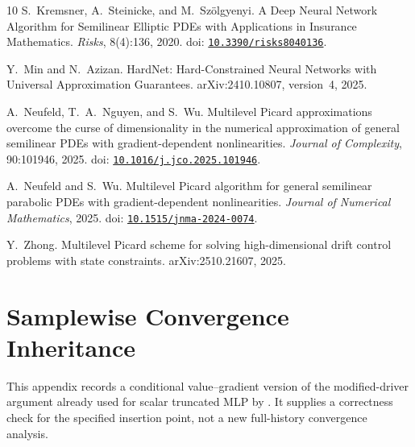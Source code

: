 \documentclass{article}
\begin{document}
\begin{thebibliography}{10}
S.~Kremsner, A.~Steinicke, and M.~Sz\"olgyenyi.
\newblock A Deep Neural Network Algorithm for Semilinear Elliptic PDEs with Applications in Insurance Mathematics.
\newblock \emph{Risks}, 8(4):136, 2020.
\newblock doi: \href{https://doi.org/10.3390/risks8040136}{\nolinkurl{10.3390/risks8040136}}.

Y.~Min and N.~Azizan.
\newblock HardNet: Hard-Constrained Neural Networks with Universal Approximation Guarantees.
\newblock arXiv:2410.10807, version~4, 2025.

A.~Neufeld, T.~A.~Nguyen, and S.~Wu.
\newblock Multilevel Picard approximations overcome the curse of dimensionality in the numerical approximation of general semilinear PDEs with gradient-dependent nonlinearities.
\newblock \emph{Journal of Complexity}, 90:101946, 2025.
\newblock doi: \href{https://doi.org/10.1016/j.jco.2025.101946}{\nolinkurl{10.1016/j.jco.2025.101946}}.

A.~Neufeld and S.~Wu.
\newblock Multilevel Picard algorithm for general semilinear parabolic PDEs with gradient-dependent nonlinearities.
\newblock \emph{Journal of Numerical Mathematics}, 2025.
\newblock doi: \href{https://doi.org/10.1515/jnma-2024-0074}{\nolinkurl{10.1515/jnma-2024-0074}}.

Y.~Zhong.
\newblock Multilevel Picard scheme for solving high-dimensional drift control problems with state constraints.
\newblock arXiv:2510.21607, 2025.

\end{thebibliography}

\clearpage
\appendix
\makeatletter
\setlength{\@fptop}{0pt}
\setlength{\@fpsep}{16pt}
\setlength{\@fpbot}{0pt plus 1fil}
\makeatother
\onecolumn
\setcounter{figure}{0}
\renewcommand{\thefigure}{A\arabic{figure}}

\section{Samplewise Convergence Inheritance}
\label{app:convergence}
This appendix records a conditional value--gradient version of the modified-driver argument already used for scalar truncated MLP by \citet[Eq.~(76), Lemma~3.2]{Beck2020}. It supplies a correctness check for the specified insertion point, not a new full-history convergence analysis.
\end{document}
